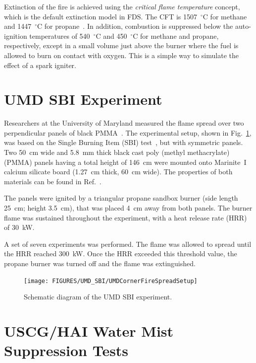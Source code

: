 Extinction of the fire is achieved using the {\em critical flame temperature} concept, which is the default extinction model in FDS. The CFT is 1507~$^\circ$C for methane and 1447~$^\circ$C for propane~\cite{SFPE:Beyler}. In addition, combustion is suppressed below the auto-ignition temperatures of 540~$^\circ$C and 450~$^\circ$C for methane and propane, respectively, except in a small volume just above the burner where the fuel is allowed to burn on contact with oxygen. This is a simple way to simulate the effect of a spark igniter.

\section{UMD SBI Experiment}
\label{UMD_SBI_Description}

Researchers at the University of Maryland measured the flame spread over two perpendicular panels of black PMMA~\cite{Chaudhari:2021}.  The experimental setup, shown in Fig.~\ref{UMD_SBI_Schematic}, was based on the Single Burning Item (SBI) test~\cite{SBI}, but with symmetric panels. Two 50~cm wide and 5.8~mm thick black cast poly (methyl methacrylate) (PMMA) panels having a total height of 146~cm were mounted onto Marinite~I calcium silicate board (1.27~cm thick, 60~cm wide). The properties of both materials can be found in Ref.~\cite{Chaudhari:2021}.

The panels were ignited by a triangular propane sandbox burner (side length 25~cm; height 3.5~cm), that was placed 4~cm away from both panels. The burner flame was sustained throughout the experiment, with a heat release rate (HRR) of 30~kW.

A set of seven experiments was performed. The flame was allowed to spread until the HRR reached 300~kW. Once the HRR exceeded this threshold value, the propane burner was turned off and the flame was extinguished.

\begin{figure}[!ht]
\texttt{[image: FIGURES/UMD\_SBI/UMDCornerFireSpreadSetup]}
\caption[Schematic diagram of the UMD SBI experiment.]{Schematic diagram of the UMD SBI experiment.}
\label{UMD_SBI_Schematic}
\end{figure}



\section{USCG/HAI Water Mist Suppression Tests}
\label{USCG_HAI_Water_Mist_Description}

